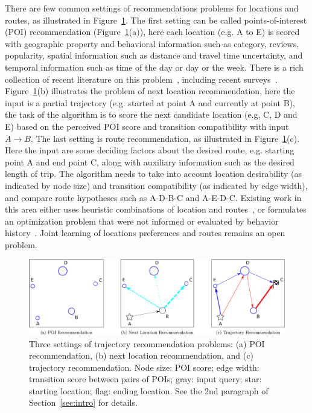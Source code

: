 There are few common settings of recommendations problems for locations and routes, as illustrated in Figure~\ref{fig:threesettings}. 
The first setting can be called points-of-interest (POI) recommendation (Figure~\ref{fig:threesettings}(a)), here each location (e.g. A to E) is scored with geographic property and behavioral information such as category, reviews, popularity, spatial information such as distance and travel time uncertainty, and temporal information such as time of the day or day or the week.  There is a rich collection of recent literature on this problem~\cite{bao2015recommendations,yin2015joint,shi2011personalized,lian2014geomf,liu2014exploiting,yuan2013timeaware,hsieh2014mining,gao2013temporal,yuan2014graph}, including recent surveys~\cite{bao2015recommendations,zheng2014urban}. 
Figure~\ref{fig:threesettings}(b) illustrates the problem of next location recommendation\cite{ijcai13,aaai16,baraglia2013learnext,zhang2015location}, here the input is a partial trajectory (e.g. started at point A and currently at point B), the task of the algorithm is to score the next candidate location (e.g, C, D and E) based on the perceived POI score and transition compatibility with input $A\rightarrow B$. 
    The last setting is route recommendation, as illustrated in Figure~\ref{fig:threesettings}(c). Here the input are some deciding factors about the desired route, e.g. starting point A and end point C, along with auxiliary information such as the desired length of trip. The algorithm needs to take into account location desirability (as indicated by node size) and transition compatibility (as indicated by edge width), and compare route hypotheses such as A-D-B-C and A-E-D-C. Existing work in this area either uses heuristic combinations of location and routes~\cite{ijcai15,lu2012personalized}, or formulates an optimization problem that were not informed or evaluated by behavior history~\cite{gioniswsdm14,chen2015tripplanner}. Joint learning of locations preferences and routes remains an open problem.

\begin{figure}[t]
	\centering
	\includegraphics[width=\textwidth]{fig/fig1-flavours.pdf}
	\caption{Three settings of trajectory recommendation problems: (a) POI recommendation, (b) next location recommendation, and (c) trajectory recommendation. Node size: POI score; edge width: transition score between pairs of POIs; gray: input query; star: starting location; flag: ending location. See the 2nd paragraph of Section~\ref{sec:intro} for details.
}
	\label{fig:threesettings}
\end{figure}

